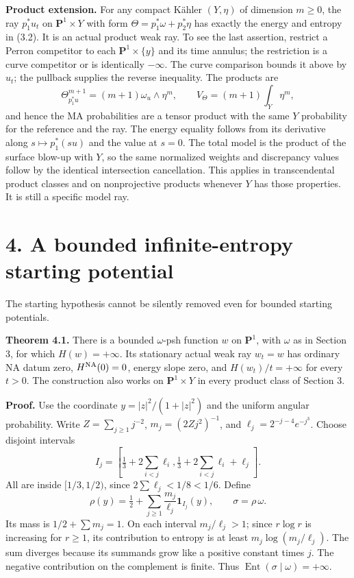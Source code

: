 \documentclass[
  11pt,
]{article}
\begin{document}
\textbf{Product extension.} For any compact Kähler \((Y,\eta)\) of
dimension \(m\geq0\), the ray \(p_1^*u_t\) on \(\mathbf P^1\times Y\)
with form \(\Theta=p_1^*\omega+p_2^*\eta\) has exactly the energy and
entropy in (3.2). It is an actual product weak ray. To see the last
assertion, restrict a Perron competitor to each
\(\mathbf P^1\times\{y\}\) and its time annulus; the restriction is a
curve competitor or is identically \(-\infty\). The curve comparison
bounds it above by \(u_t\); the pullback supplies the reverse
inequality. The products are \[
 \Theta_{p_1^*u}^{m+1}=(m+1)\omega_u\wedge\eta^m,
 \qquad V_\Theta=(m+1)\int_Y\eta^m,
\] and hence the MA probabilities are a tensor product with the same
\(Y\) probability for the reference and the ray. The energy equality
follows from its derivative along \(s\mapsto p_1^*(su)\) and the value
at \(s=0\). The total model is the product of the surface blow-up with
\(Y\), so the same normalized weights and discrepancy values follow by
the identical intersection cancellation. This applies in transcendental
product classes and on nonprojective products whenever \(Y\) has those
properties. It is still a specific model ray.

\section{4. A bounded infinite-entropy starting
potential}\label{a-bounded-infinite-entropy-starting-potential}

The starting hypothesis cannot be silently removed even for bounded
starting potentials.

\textbf{Theorem 4.1.} There is a bounded \(\omega\)-psh function \(w\)
on \(\mathbf P^1\), with \(\omega\) as in Section 3, for which
\(H(w)=+\infty\). Its stationary actual weak ray \(w_t=w\) has ordinary
NA datum zero, \(H^{\rm NA}(0)=0\), energy slope zero, and
\(H(w_t)/t=+\infty\) for every \(t>0\). The construction also works on
\(\mathbf P^1\times Y\) in every product class of Section 3.

\textbf{Proof.} Use the coordinate \(y=|z|^2/(1+|z|^2)\) and the uniform
angular probability. Write \(Z=\sum_{j\geq1}j^{-2}\),
\(m_j=(2Zj^2)^{-1}\), and \(\ell_j=2^{-j-4}e^{-j^3}\). Choose disjoint
intervals \[
 I_j=\left[\tfrac13+2\sum_{i<j}\ell_i,
               \tfrac13+2\sum_{i<j}\ell_i+\ell_j\right].
\] All are inside \([1/3,1/2)\), since \(2\sum\ell_j<1/8<1/6\). Define
\[
 \rho(y)=\tfrac12+\sum_{j\geq1}\frac{m_j}{\ell_j}\mathbf1_{I_j}(y),
 \qquad \sigma=\rho\,\omega.
                                                               \tag{4.1}
\] Its mass is \(1/2+\sum m_j=1\). On each interval \(m_j/\ell_j>1\);
since \(r\log r\) is increasing for \(r\geq1\), its contribution to
entropy is at least \(m_j\log(m_j/\ell_j)\). The sum diverges because
its summands grow like a positive constant times \(j\). The negative
contribution on the complement is finite. Thus
\(\operatorname{Ent}(\sigma\mid\omega)=+\infty\).
\end{document}
